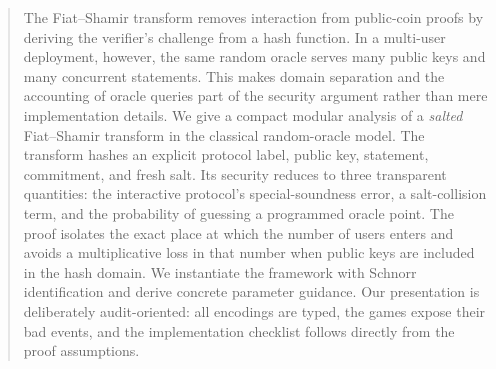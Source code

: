 \documentclass[runningheads]{llncs}
\begin{document}
\maketitle

\begin{abstract}
The Fiat--Shamir transform removes interaction from public-coin proofs by
deriving the verifier's challenge from a hash function.  In a multi-user
deployment, however, the same random oracle serves many public keys and many
concurrent statements.  This makes domain separation and the accounting of
oracle queries part of the security argument rather than mere implementation
details.  We give a compact modular analysis of a \emph{salted} Fiat--Shamir
transform in the classical random-oracle model.  The transform hashes an
explicit protocol label, public key, statement, commitment, and fresh salt.
Its security reduces to three transparent quantities: the interactive
protocol's special-soundness error, a salt-collision term, and the probability
of guessing a programmed oracle point.  The proof isolates the exact place at
which the number of users enters and avoids a multiplicative loss in that
number when public keys are included in the hash domain.  We instantiate the
framework with Schnorr identification and derive concrete parameter guidance.
Our presentation is deliberately audit-oriented: all encodings are typed,
the games expose their bad events, and the implementation checklist follows
directly from the proof assumptions.

\end{abstract}











\end{document}
